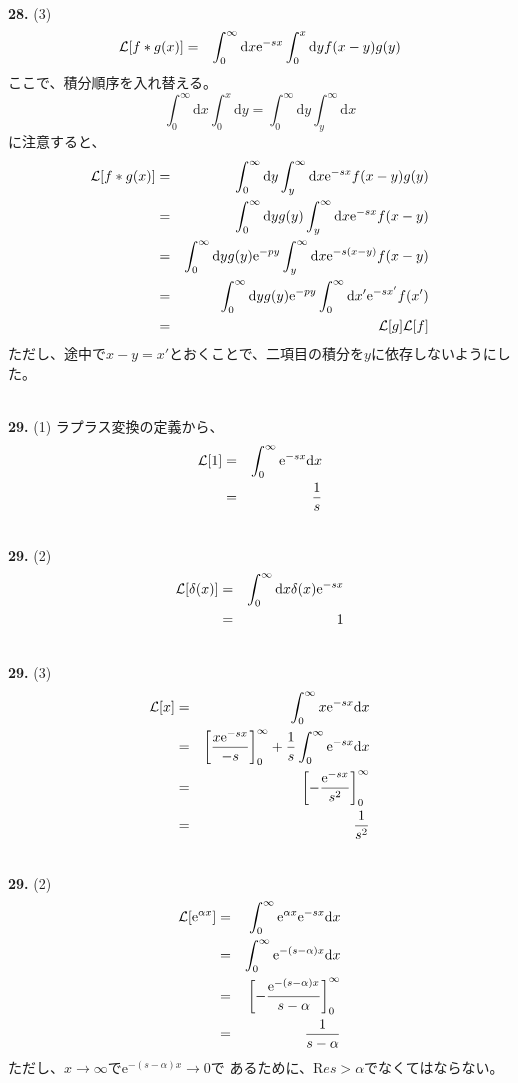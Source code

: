\documentclass{jarticle}
\newcommand{\diff}{\mathrm d}
\newcommand{\ans}[2]{\noindent\\ {\bf \large #1.} (#2)}
\newcommand{\e}{\mathrm e}
\begin{document}
\ans{28}{3}
\begin{eqnarray}
  {\cal L}[f*g(x)] &=&  \int_{0}^{\infty} \diff x \e^{-sx} \int_{0}^{x} \diff y f(x-y)g(y)
\end{eqnarray}
ここで、積分順序を入れ替える。
\begin{equation}
  \int_0^{\infty} \diff x \int_0^{x} \diff y = \int_0^{\infty} \diff y \int_y^{\infty} \diff x
\end{equation}
に注意すると、
\begin{eqnarray}
  {\cal L}[f*g(x)] &=&  \int_0^{\infty} \diff y \int_y^{\infty} \diff x  \e^{-sx} f(x-y)g(y) \\
  &=& \int_0^{\infty} \diff y g(y) \int_y^{\infty} \diff x  \e^{-sx} f(x-y) \\
  &=& \int_0^{\infty} \diff y g(y) \e^{-py} \int_y^{\infty} \diff x  \e^{-s(x-y)} f(x-y) \\
  &=& \int_0^{\infty} \diff y g(y) \e^{-py} \int_0^{\infty} \diff x'  \e^{-sx'} f(x') \\
  &=& {\cal L}[g] {\cal L}[f]
\end{eqnarray}
ただし、途中で$x-y = x'$とおくことで、二項目の積分を$y$に依存しないようにした。


\ans{29}{1}
ラプラス変換の定義から、
\begin{eqnarray}
  {\cal L}[1] &=& \int_0^{\infty} \e^{-sx} \diff x\\
  &=& \frac{1}{s}
\end{eqnarray}

\ans{29}{2}
\begin{eqnarray}
  {\cal L}[\delta(x)] &=& \int_0^{\infty} \diff x \delta(x) \e^{-sx}\\
  &=& 1
\end{eqnarray}

\ans{29}{3}
\begin{eqnarray}
  {\cal L}[x] &=& \int_0^{\infty}  x \e^{-sx} \diff x\\
  &=& \left[ \frac{x \e^{-sx}}{-s} \right]_0^{\infty} + \frac{1}{s} \int_0^{\infty} \e^{-sx} \diff x\\
  &=& \left[ -\frac{\e^{-sx}}{s^2} \right]_0^{\infty} \\
  &=& \frac{1}{s^2}
\end{eqnarray}

\ans{29}{2}
\begin{eqnarray}
  {\cal L}[\e^{\alpha x}] &=& \int_0^{\infty}  \e^{\alpha x} \e^{-sx} \diff x\\
  &=& \int_0^{\infty}  \e^{-(s-\alpha)x} \diff x\\
  &=& \left[ - \frac{\e^{-(s-\alpha)x}}{s-\alpha}  \right]_0^{\infty}\\
  &=& \frac{1}{s-\alpha}
\end{eqnarray}
ただし、$x \rightarrow \infty$で$\e^{-(s-\alpha)x} \rightarrow 0$で
あるために、${\mathrm Re} s > \alpha$でなくてはならない。
\end{document}
